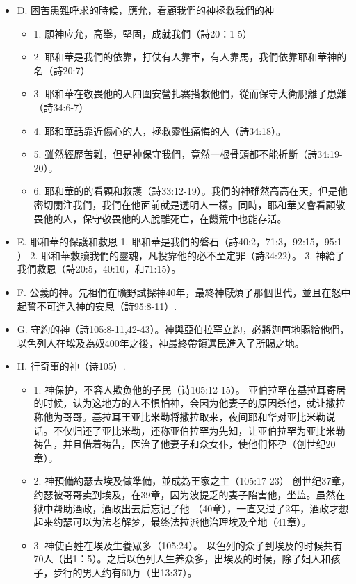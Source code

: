 \begin{itemize}
\begin{itemize}
\begin{itemize}
\end{itemize}
\item D.	困苦患難呼求的時候，應允，看顧我們的神拯救我們的神
\begin{itemize}
\item 1.	願神应允，高舉，堅固，成就我們（詩20：1-5）
\item 2.	耶和華是我們的依靠，打仗有人靠車，有人靠馬，我們依靠耶和華神的名（詩20:7）
\item 3.	耶和華在敬畏他的人四圍安營扎寨搭救他們，從而保守大衛脫離了患難（詩34:6-7）
\item 4.	耶和華話靠近傷心的人，拯救靈性痛悔的人（詩34:18）。
\item 5.	雖然經歷苦難，但是神保守我們，竟然一根骨頭都不能折斷（詩34:19-20）。
\item 6.	耶和華的的看顧和救護（詩33:12-19）。我們的神雖然高高在天，但是他密切關注我們，我們在他面前就是透明人一樣。同時，耶和華又會看顧敬畏他的人，保守敬畏他的人脫離死亡，在饑荒中也能存活。
\end{itemize}
\item E.	耶和華的保護和救恩
1.	耶和華是我們的磐石（詩40:2，71:3，92:15，95:1 ）
2.	耶和華救贖我們的靈魂，凡投靠他的必不至定罪（詩34:22）。
3.	神給了我們救恩（詩20:5，40:10，和71:15）。
\item F.	公義的神。先祖們在曠野試探神40年，最終神厭煩了那個世代，並且在怒中起誓不可進入神的安息（詩95:8-11）.
\item G.	守約的神（詩105:8-11,42-43）。神與亞伯拉罕立約，必將迦南地賜給他們，以色列人在埃及為奴400年之後，神最終帶領選民進入了所賜之地。
\item H.	行奇事的神（诗105）.
\begin{itemize}
\item 1.	神保护，不容人欺负他的子民（诗105:12-15）。
亚伯拉罕在基拉耳寄居的时候，认为这地方的人不惧怕神，会因为他妻子的原因杀他，就让撒拉称他为哥哥。基拉耳王亚比米勒将撒拉取来，夜间耶和华对亚比米勒说话。不仅归还了亚比米勒，还称亚伯拉罕为先知，让亚伯拉罕为亚比米勒祷告，并且借着祷告，医治了他妻子和众女仆，使他们怀孕（创世纪20章）。
\item 2.	神預備約瑟去埃及做準備，並成為王家之主（105:17-23）
创世纪37章，约瑟被哥哥卖到埃及，在39章，因为波提乏的妻子陷害他，坐监。虽然在狱中帮助酒政，酒政出去后忘记了他 （40章），一直又过了2年，酒政才想起来约瑟可以为法老解梦，最终法拉派他治理埃及全地（41章）。
\item 3.	神使百姓在埃及生養眾多（105:24）。
以色列的众子到埃及的时候共有70人（出1：5）。之后以色列人生养众多，出埃及的时候，除了妇人和孩子，步行的男人约有60万（出13:37）。

\end{itemize}
\end{itemize}
\end{itemize}
